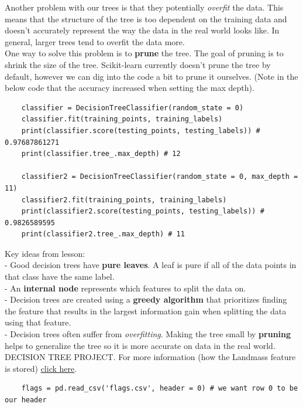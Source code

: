 \documentclass[11pt, a4paper]{article}
\begin{document}
\begin{spacing}{1.1}
	\noindent Another problem with our trees is that they potentially \textit{overfit} the data. This means that the structure of the tree is too dependent on the training data and doesn’t accurately represent the way the data in the real world looks like. In general, larger trees tend to overfit the data more. \vspace*{2mm} \\
	One way to solve this problem is to \textbf{prune} the tree. The goal of pruning is to shrink the size of the tree. Scikit-learn currently doesn’t prune the tree by default, however we can dig into the code a bit to prune it ourselves. (Note in the below code that the accuracy increased when setting the max depth). 
	\begin{lstlisting}
	classifier = DecisionTreeClassifier(random_state = 0)
	classifier.fit(training_points, training_labels)
	print(classifier.score(testing_points, testing_labels)) # 0.97687861271
	print(classifier.tree_.max_depth) # 12
	
	classifier2 = DecisionTreeClassifier(random_state = 0, max_depth = 11)
	classifier2.fit(training_points, training_labels)
	print(classifier2.score(testing_points, testing_labels)) # 0.9826589595
	print(classifier2.tree_.max_depth) # 11	\end{lstlisting} \vspace*{1mm}
	Key ideas from lesson: \\
	- Good decision trees have \textbf{pure leaves}. A leaf is pure if all of the data points in that class have the \hspace*{2mm} same label. \\
	- An \textbf{internal node} represents which features to split the data on. \\
	- Decision trees are created using a \textbf{greedy algorithm} that prioritizes finding the feature that results \hspace*{2mm} in the largest information gain when splitting the data using that feature. \\
	- Decision trees often suffer from \textit{overfitting}. Making the tree small by \textbf{pruning} helps to generalize the \hspace*{2mm} tree so it is more accurate on data in the real world. \vspace*{1mm} \\
	DECISION TREE PROJECT. For more information (how the Landmass feature is stored) \href{http://archive.ics.uci.edu/ml/datasets/Flags}{click here}.
	\begin{lstlisting}
	flags = pd.read_csv('flags.csv', header = 0) # we want row 0 to be our header
	

\end{lstlisting}
\end{spacing}
\end{document}
